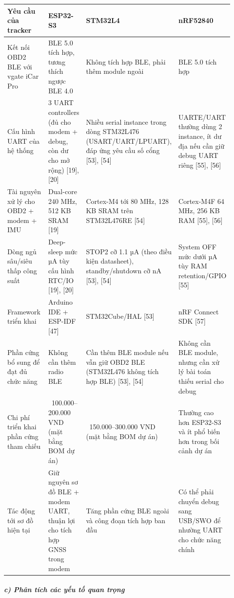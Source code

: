 \documentclass[13pt,a4paper]{extarticle}
\newcounter{none} %
\newcommand{\thesislongtableorignewline}{}
\let\thesislongtableorignewline\\
\renewcommand{\\}{\thesislongtableorignewline\hline}%
\let\\\thesislongtableorignewline
\begin{document}
{\def\LTcaptype{none} %
\begin{longtable}{|p{0.30\linewidth}|p{0.16\linewidth}|p{0.20\linewidth}|p{0.26\linewidth}|}
\hline \textbf{Yêu cầu của tracker} & \textbf{ESP32-S3} & \textbf{STM32L4} & \textbf{nRF52840} \\
\hline
\endhead
\hline
\endlastfoot
Kết nối OBD2 BLE với vgate iCar Pro & BLE 5.0 tích hợp, tương thích
ngược BLE 4.0 & Không tích hợp BLE, phải thêm module ngoài & BLE 5.0
tích hợp \\
Cấu hình UART của hệ thống & 3 UART controllers (đủ cho modem + debug,
còn dư cho mở rộng) {[}19{]}, {[}20{]} & Nhiều serial instance trong
dòng STM32L476 (USART/UART/LPUART), đáp ứng yêu cầu số cổng {[}53{]},
{[}54{]} & UARTE/UART thường dùng 2 instance, ít dư địa nếu cần giữ
debug UART riêng {[}55{]}, {[}56{]} \\
Tài nguyên xử lý cho OBD2 + modem + IMU & Dual-core 240 MHz, 512 KB SRAM
{[}19{]} & Cortex-M4 tới 80 MHz, 128 KB SRAM trên STM32L476RE {[}54{]} &
Cortex-M4F 64 MHz, 256 KB RAM {[}55{]}, {[}56{]} \\
Dòng ngủ sâu/siêu thấp công suất & Deep-sleep mức µA tùy cấu hình RTC/IO
{[}19{]}, {[}20{]} & STOP2 cỡ 1.1 µA (theo điều kiện datasheet),
standby/shutdown cỡ nA {[}53{]}, {[}54{]} & System OFF mức dưới µA tùy
RAM retention/GPIO {[}55{]} \\
Framework triển khai & Arduino IDE + ESP-IDF {[}47{]} & STM32Cube/HAL
{[}53{]} & nRF Connect SDK {[}57{]} \\
Phần cứng bổ sung để đạt đủ chức năng & Không cần thêm radio BLE & Cần
thêm BLE module nếu vẫn giữ OBD2 BLE (STM32L476 không tích hợp BLE)
{[}53{]}, {[}54{]} & Không cần BLE module, nhưng cần xử lý bài toán
thiếu serial cho debug \\
Chi phí triển khai phần cứng tham chiếu &
~100.000--200.000 VND (mặt bằng BOM dự án) &
~150.000--300.000 VND (mặt bằng BOM dự án) & Thường cao
hơn ESP32-S3 và ít phổ biến hơn trong bối cảnh dự án \\
Tác động tới sơ đồ hiện tại & Giữ nguyên sơ đồ BLE + modem UART, thuận
lợi cho tích hợp GNSS trong modem & Tăng phần cứng BLE ngoài và công
đoạn tích hợp ban đầu & Có thể phải chuyển debug sang USB/SWO để nhường
UART cho chức năng chính \\
\end{longtable}
}

\subparagraph{c) Phân tích các yếu tố quan
trọng}\label{c-phuxe2n-tuxedch-cuxe1c-yux1ebfu-tux1ed1-quan-trux1ecdng}
\end{document}

